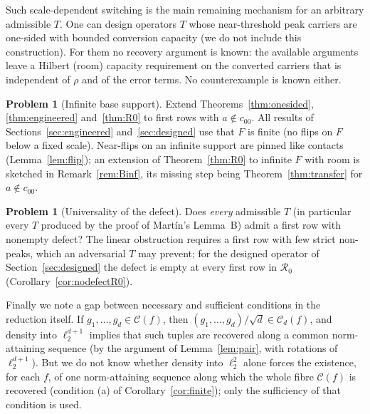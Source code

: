 \documentclass[10pt]{amsart}
\theoremstyle{definition}
\newtheorem{problem}[theorem]{Problem}
\theoremstyle{remark}
\newcommand{\Cset}{\mathcal C}
\begin{document}
Such scale-dependent switching is the main remaining mechanism for an
arbitrary admissible $T$.  One can design operators $T$ whose
near-threshold peak carriers are one-sided with bounded conversion capacity
(we do not include this construction).  For them no recovery argument is
known: the available arguments leave a Hilbert (room) capacity requirement
on the converted carriers that is independent of $\rho$ and of the error
terms.  No counterexample is known either.

\begin{problem}[Infinite base support]\label{prob:infiniteF}
Extend Theorems~\ref{thm:onesided}, \ref{thm:engineered} and~\ref{thm:R0}
to first rows with $a\notin c_{00}$.  All results of
Sections~\ref{sec:engineered} and~\ref{sec:designed} use that $F$ is finite
(no flips on $F$ below a fixed scale).  Near-flips on an infinite support
are pinned like contacts (Lemma~\ref{lem:flip}); an extension of
Theorem~\ref{thm:R0} to infinite $F$ with room is sketched in
Remark~\ref{rem:Binf}, its missing step being Theorem~\ref{thm:transfer}
for $a\notin c_{00}$.
\end{problem}

\begin{problem}[Universality of the defect]\label{prob:universal}
Does \emph{every} admissible $T$ (in particular every $T$ produced by the
proof of Mart\'in's Lemma~B) admit a first row with nonempty defect?  The
linear obstruction requires a first row with few strict non-peaks, which an
adversarial $T$ may prevent; for the designed operator of
Section~\ref{sec:designed} the defect is empty at every first row in
$\mathcal R_0$ (Corollary~\ref{cor:nodefectR0}).
\end{problem}

Finally we note a gap between necessary and sufficient conditions in the
reduction itself.  If $g_1,\dots,g_d\in\Cset(f)$, then
$(g_1,\dots,g_d)/\sqrt d\in\Cset_d(f)$, and density into $\ell_2^{d+1}$
implies that such tuples are recovered along a common norm-attaining
sequence (by the argument of Lemma~\ref{lem:pair}, with rotations of
$\ell_2^{d+1}$).  But we do not
know whether density into $\ell_2^2$ alone forces the existence, for each
$f$, of one norm-attaining sequence along which the whole fibre $\Cset(f)$ is
recovered (condition (a) of Corollary~\ref{cor:finite}); only the
sufficiency of that condition is used.
\end{document}
